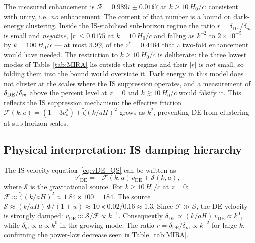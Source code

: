\documentclass[12pt,a4paper]{article}
\newcommand{\ztilde}{\tilde{\zeta}}
\begin{document}
The measured enhancement is $\mathcal{R} = 0.9897 \pm 0.0167$ at $k \geq 10\,H_0/c$:
consistent with unity, i.e.\ \emph{no} enhancement. The content of that number is
a bound on dark-energy clustering. Inside the IS-stabilised sub-horizon regime
the ratio $r = \delta_{\mathrm{DE}}/\delta_m$ is small and \emph{negative},
$|r| \leq 0.0175$ at $k = 10\,H_0/c$ and falling as $k^{-2}$ to
$2\times10^{-5}$ by $k = 100\,H_0/c$ --- at most $3.9\%$ of the $r^*=0.4464$
that a two-fold enhancement would have needed. The restriction to
$k \geq 10\,H_0/c$ is deliberate: the three lowest modes of
Table~\ref{tab:MIRA} lie outside that regime and their $|r|$ is \emph{not}
small, so folding them into the bound would overstate it.
Dark energy in this model does not cluster at the scales where the IS
suppression operates, and a measurement of $\delta_{\rm DE}/\delta_m$ above the
percent level at $z=0$ and $k \gtrsim 10\,H_0/c$ would falsify it.
This reflects the IS suppression mechanism: the effective friction
$\mathcal{F}(k,a) = (1-3c^2_s) + \ztilde(k/aH)^2$ grows as $k^2$,
preventing DE from clustering at sub-horizon scales.

\subsection{Physical interpretation: IS damping hierarchy}
\label{subsec:damping}

The IS velocity equation~\eqref{eq:vDE_QS} can be written as
\begin{equation}
  v'_{\mathrm{DE}} = -\mathcal{F}(k,a)\,v_{\mathrm{DE}} + \mathcal{S}(k,a),
\end{equation}
where $\mathcal{S}$ is the gravitational source.
For $k \geq 10\,H_0/c$ at $z=0$: $\mathcal{F} \approx \ztilde\,(k/aH)^2 \approx 1.84\times 100 = 184$.
The source $\mathcal{S} \approx (k/aH)\,\Phi/(1+w) \approx 10 \times 0.02/0.16 \approx 1.3$.
Since $\mathcal{F} \gg \mathcal{S}$, the DE velocity is strongly damped:
$v_{\mathrm{DE}} \approx \mathcal{S}/\mathcal{F} \propto k^{-1}$.
Consequently $\delta_{\mathrm{DE}} \propto (k/aH)\,v_{\mathrm{DE}} \propto k^0$,
while $\delta_m \propto a \propto k^0$ in the growing mode.
The ratio $r = \delta_{\mathrm{DE}}/\delta_m \propto k^{-2}$ for large $k$,
confirming the power-law decrease seen in Table~\ref{tab:MIRA}.
\end{document}
